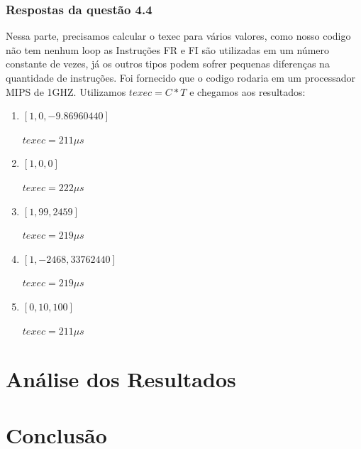 \documentclass[12pt]{article}
\begin{document}
	

\subsubsection{Respostas da questão 4.4}
\label{subsubsec:4.4}
Nessa parte, precisamos calcular o texec para vários valores, como nosso codigo não tem nenhum loop as Instruções FR e FI são utilizadas em um número constante de vezes, já os outros tipos podem sofrer pequenas diferenças na quantidade de instruções. Foi fornecido que o codigo rodaria em um processador MIPS de 1GHZ. Utilizamos \(texec= C * T\) e chegamos aos resultados:

\begin{enumerate}[label={\alph*)}]

\item \([1, 0, -9.86960440]\)

	\(texec = 211 \mu s\)
\item \([1, 0, 0]\)

	\(texec = 222 \mu s\)
\item \([1, 99, 2459]\)

	\(texec = 219 \mu s\)
	
\item \([1, -2468, 33762440]\)

	\(texec = 219 \mu s\)
\item \([0, 10, 100]\)

	\(texec = 211 \mu s\)
\end{enumerate}




\section{Análise dos Resultados}
\label{sec:Resultados}

\section{Conclusão}
\label{sec:Conclusao}



\end{document}
